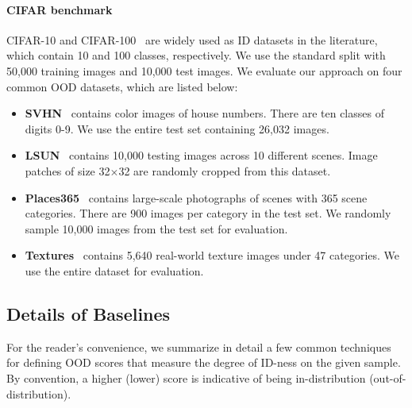 \documentclass{article}
\begin{document}
\paragraph{CIFAR benchmark} CIFAR-10 and CIFAR-100~\cite{krizhevsky2009learning} are widely used as ID datasets in the literature, which contain 10 and 100 classes, respectively. We use the standard split with 50,000 training images and 10,000 test images. We evaluate our approach on four common OOD datasets, which are listed below:
\begin{itemize}
    \item \textbf{SVHN}~\cite{netzer2011reading} contains color images of house numbers. There are ten classes of digits 0-9. We use the entire test set containing 26,032 images.
    \vspace{-0.1cm}
    \item \textbf{LSUN}~\cite{yu2015lsun} contains 10,000 testing images across 10 different scenes. Image patches of size 32$\times$32 are randomly cropped from this dataset.
    \vspace{-0.1cm}
    \item \textbf{Places365}~\cite{zhou2017places} contains large-scale photographs of scenes with 365 scene categories. There are 900 images per category in the test set. We randomly sample 10,000 images from the test set for evaluation.
    \vspace{-0.1cm}
    \item \textbf{Textures}~\cite{cimpoi14describing} contains 5,640 real-world texture images under 47 categories. We use the entire dataset for evaluation.
\end{itemize}

\subsection{Details of Baselines}
\label{app:baseline}

For the reader's convenience, we summarize in detail a few common techniques for defining OOD scores that measure the degree of ID-ness on the given sample.
By convention, a higher (lower) score is indicative of being in-distribution (out-of-distribution).

\end{document}
